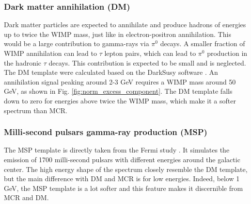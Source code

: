 %
%
%




\subsubsection{Dark matter annihilation (DM)}

Dark matter particles are expected to annihilate and produce hadrons of energies up to twice the WIMP mass, just like in electron-positron annihilation. This would be a large contribution to gamma-rays via $\pi^0$ decays. A smaller fraction of WIMP annihilation can lead to $\tau$ lepton pairs, which can lead to $\pi^0$ production in the hadronic $\tau$ decays. This contribution is expected to be small and is neglected. The DM template were calculated based on the DarkSusy software \cite{Gondolo2004} \cite{Gondolo2005}. 
An annihilation signal peaking around 2-3 GeV requires a WIMP mass around 50 GeV, as shown in Fig. \ref{fig:norm_excess_component}. 
The DM template falls down to zero for energies above twice the WIMP mass, which make it a softer spectrum than MCR. 

%


\subsubsection{Milli-second pulsars gamma-ray production (MSP)}

The MSP template is directly taken from the Fermi study \cite{Fermi2017}. It simulates the emission of 1700 milli-second pulsars with different energies around the galactic center.
The high energy shape of the spectrum closely resemble the DM template, but the main difference with DM and MCR is for low energies. Indeed, below 1 GeV, the MSP template is a lot softer and this feature makes it discernible from MCR and DM.

